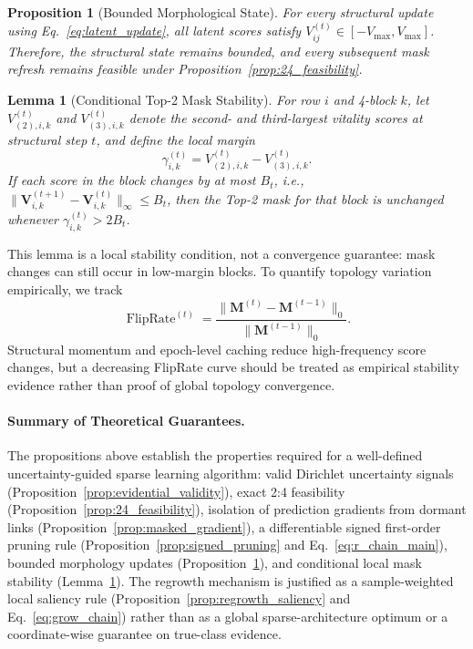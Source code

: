 \documentclass[letterpaper]{article} %
\newtheorem{lemma}{Lemma}
\newtheorem{proposition}{Proposition}
\begin{document}
\begin{proposition}[Bounded Morphological State]
\label{prop:bounded_scores}
For every structural update using Eq.~\ref{eq:latent_update}, all latent scores satisfy $V_{ij}^{(t)}\in[-V_{\max},V_{\max}]$. Therefore, the structural state remains bounded, and every subsequent mask refresh remains feasible under Proposition~\ref{prop:24_feasibility}.
\end{proposition}

\begin{lemma}[Conditional Top-2 Mask Stability]
\label{lem:mask_stability}
For row $i$ and 4-block $k$, let $V_{(2),i,k}^{(t)}$ and $V_{(3),i,k}^{(t)}$ denote the second- and third-largest vitality scores at structural step $t$, and define the local margin
\begin{equation}\label{eq:top2_margin}
    \gamma_{i,k}^{(t)}
    =
    V_{(2),i,k}^{(t)}-V_{(3),i,k}^{(t)} .
\end{equation}
If each score in the block changes by at most $B_t$, i.e.,
$\|\bm{V}_{i,k}^{(t+1)}-\bm{V}_{i,k}^{(t)}\|_\infty\le B_t$, then the Top-2 mask for that block is unchanged whenever $\gamma_{i,k}^{(t)}>2B_t$.
\end{lemma}

This lemma is a local stability condition, not a convergence guarantee: mask changes can still occur in low-margin blocks. To quantify topology variation empirically, we track
\begin{equation}\label{eq:flip_rate}
    \operatorname{FlipRate}^{(t)}
    =
    \frac{\|\bm{M}^{(t)}-\bm{M}^{(t-1)}\|_0}
    {\|\bm{M}^{(t-1)}\|_0}.
\end{equation}
Structural momentum and epoch-level caching reduce high-frequency score changes, but a decreasing FlipRate curve should be treated as empirical stability evidence rather than proof of global topology convergence.

\paragraph{Summary of Theoretical Guarantees.}
The propositions above establish the properties required for a well-defined uncertainty-guided sparse learning algorithm: valid Dirichlet uncertainty signals (Proposition~\ref{prop:evidential_validity}), exact 2:4 feasibility (Proposition~\ref{prop:24_feasibility}), isolation of prediction gradients from dormant links (Proposition~\ref{prop:masked_gradient}), a differentiable signed first-order pruning rule (Proposition~\ref{prop:signed_pruning} and Eq.~\ref{eq:r_chain_main}), bounded morphology updates (Proposition~\ref{prop:bounded_scores}), and conditional local mask stability (Lemma~\ref{lem:mask_stability}). The regrowth mechanism is justified as a sample-weighted local saliency rule (Proposition~\ref{prop:regrowth_saliency} and Eq.~\ref{eq:grow_chain}) rather than as a global sparse-architecture optimum or a coordinate-wise guarantee on true-class evidence.
\end{document}
